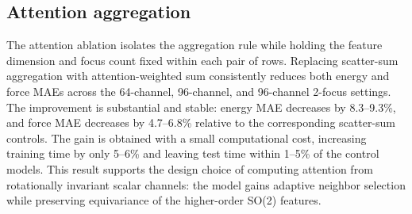 \FloatBarrier
\subsection{Attention aggregation}
\label{sec:sm-attention-aggregation}

The attention ablation isolates the aggregation rule while holding the feature
dimension and focus count fixed within each pair of rows. Replacing scatter-sum
aggregation with attention-weighted sum consistently reduces both energy and
force MAEs across the 64-channel, 96-channel, and 96-channel 2-focus settings.
The improvement is substantial and stable: energy MAE decreases by 8.3--9.3\%,
and force MAE decreases by 4.7--6.8\% relative to the corresponding scatter-sum
controls. The gain is obtained with a small computational cost, increasing
training time by only 5--6\% and leaving test time within 1--5\% of the control
models. This result supports the design choice of computing attention from
rotationally invariant scalar channels: the model gains adaptive neighbor
selection while preserving equivariance of the higher-order SO(2) features.

